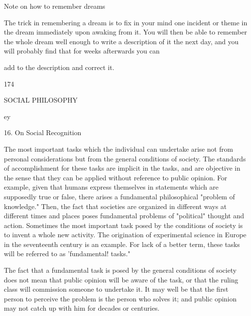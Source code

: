 \documentclass[10pt,twoside]{memoir}
\begin{document}
\begin{enumerate}
{\begin{enumerate}
\begin{sysrules}
\begin{sysrules}
\begin{sysrules}
\begin{sysrules}
{\begin{enumerate}
{{{{{{{Note on how to remember dreams 

The trick in remembering a dream is to fix in your mind one incident or 
theme in the dream immediately upon awaking from it. You will then be 
able to remember the whole dream well enough to write a description of it 
the next day, and you will probably find that for weeks afterwards you can 


add to the description and correct it. 


174 


SOCIAL PHILOSOPHY 


ey 


16. On Social Recognition 


The most important tasks which the individual can undertake arise not 
from personal considerations but from the general conditions of society. The 
standards of accomplishment for these tasks are implicit in the tasks, and are 
objective in the sense that they can be applied without reference to public 
opinion. For example, given that humans express themselves in statements 
which are supposedly true or false, there arises a fundamental philosophical 
"problem of knowledge." Then, the fact that societies are organized in 
different ways at different times and places poses fundamental problems of 
"political" thought and action. Sometimes the most important task posed by 
the conditions of society is to invent a whole new activity. The origination 
of experimental science in Europe in the seventeenth century is an example. 
For lack of a better term, these tasks will be referred to as 'fundamental! 
tasks." 

The fact that a fundamental task is posed by the general conditions of 
society does not mean that public opinion will be aware of the task, or that 
the ruling class will commission someone to undertake it. It may well be that 
the first person to perceive the problem is the person who solves it; and 
public opinion may not catch up with him for decades or centuries. 

}}}}}}}
\end{enumerate}}
\end{sysrules}
\end{sysrules}
\end{sysrules}
\end{sysrules}
\end{enumerate}}
\end{enumerate}
\end{document}
